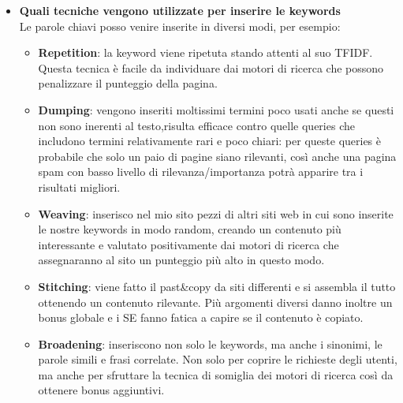 \documentclass[10pt,                    %
               a4paper,                 %
               twoside,                 %
               openright,               %
               english,                 
               italian,                 
]{article}
\begin{document}
\begin{itemize}
\item \textbf{Quali tecniche vengono utilizzate per inserire le keywords} \\
Le parole chiavi posso venire inserite in diversi modi, per esempio:
\begin{itemize}
\item \textbf{Repetition}: la keyword viene ripetuta stando attenti al suo 
TFIDF. Questa tecnica è facile da individuare dai motori di ricerca che 
possono penalizzare il punteggio della pagina.
\item \textbf{Dumping}: vengono inseriti moltissimi termini poco usati anche 
se questi non sono inerenti al testo,risulta efficace contro quelle queries  
che includono termini relativamente rari e poco chiari: per queste queries è 
probabile che solo un paio di pagine siano rilevanti, così anche una pagina  
spam con basso livello di rilevanza/importanza potrà apparire tra i risultati 
migliori.
\item \textbf{Weaving}: inserisco nel mio sito pezzi di altri siti web in cui 
sono inserite le nostre keywords in modo random, creando un contenuto più 
interessante e valutato positivamente dai motori di ricerca che assegnaranno 
al sito un punteggio più alto in questo modo.
\item \textbf{Stitching}: viene fatto il past\&copy da siti differenti e si 
assembla il tutto ottenendo un contenuto rilevante. Più argomenti diversi 
danno inoltre un bonus globale e i SE fanno fatica a capire se il contenuto è 
copiato.
\item \textbf{Broadening}: inseriscono non solo le keywords, ma anche i 
sinonimi, le parole simili e frasi correlate. Non solo per coprire le 
richieste degli utenti, ma anche per sfruttare la tecnica di somiglia dei 
motori di ricerca così da ottenere bonus aggiuntivi. 
\end{itemize}
 

\end{itemize}
\end{document}

